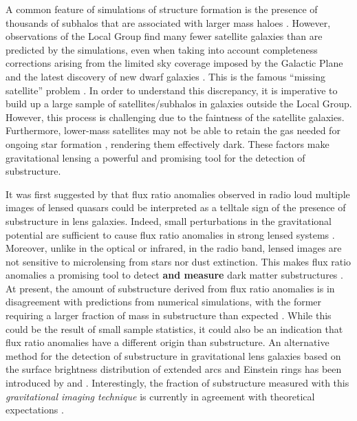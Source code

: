 \documentclass[useAMS,usenatbib]{mn2e}
\begin{document}
A common feature of simulations of structure formation is the presence
of thousands of subhalos that are associated with larger mass haloes \citep[e.g.][]{Springel08}.
However, observations of the Local Group find many fewer satellite
galaxies than are predicted by the simulations, even when taking into
account completeness corrections arising from the limited sky coverage
imposed by the Galactic Plane and the latest discovery of new dwarf galaxies \citep{DES15,Kop15}.  
This is the famous ``missing satellite'' problem \citep{Klypin1999, Moore1999, S07}. In order to
understand this discrepancy, it is imperative to build up a large
sample of satellites/subhalos in galaxies outside the Local Group.
 However, this process is challenging due to the faintness of the satellite
galaxies.  Furthermore, lower-mass satellites may not be able to
retain the gas needed for ongoing star formation \citep[e.g.,][]{P11},
rendering them effectively dark.  These factors make gravitational
lensing a powerful and promising tool for the detection of
substructure.

It was first suggested by \citet{Mao1998} that flux ratio anomalies
observed in radio loud multiple images of lensed quasars could be
interpreted as a telltale sign of the presence of substructure in lens
galaxies.  Indeed, small perturbations in the gravitational potential
are sufficient to cause flux ratio anomalies in strong lensed systems
\citep{Bradac02}.  Moreover, unlike in the optical or infrared, in the
radio band, lensed images are not sensitive to microlensing from
stars nor dust extinction. This makes flux ratio anomalies a promising
tool to detect \textbf{and measure} dark matter substructures \citep{Dalal2002, N13}.  At
present, the amount of substructure derived from flux ratio anomalies
is in disagreement with predictions from numerical simulations, with
the former requiring a larger fraction of mass in substructure than
expected \citep{Xu14}. While this could be the result of small sample
statistics, it could also be an indication that flux ratio anomalies
have a different origin than substructure.
%
An alternative method for
the detection of substructure in gravitational lens galaxies based on
the surface brightness distribution of extended arcs and Einstein rings
has been introduced by \citet{K05} and \citet{V09}. Interestingly, the fraction of
substructure measured with this \emph{gravitational imaging technique}
is currently in agreement with theoretical expectations \citep{V14a}.
\end{document}

